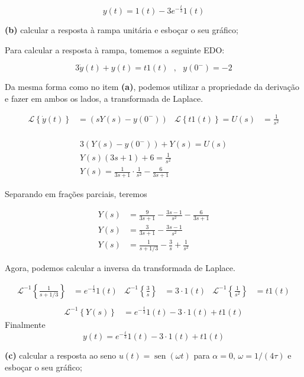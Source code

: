 \documentclass{article}
\DeclareMathOperator{\sen}{sen}
\begin{document}
\[y(t) = 1(t) - 3e^{-\frac{t}{3}}1(t)\]


\textbf{(b)} calcular a resposta à rampa unitária e esboçar o seu gráfico;

Para calcular a resposta à rampa, tomemos a seguinte EDO:

\[3\dot{y}(t) + y(t) = t1(t) \,\,\,\,,\,\,\,\,y(0^-) = -2\]

Da mesma forma como no item \textbf{(a)}, podemos utilizar a propriedade da derivação e fazer em ambos os lados, a transformada de Laplace.

\begin{align*}
    \mathcal{L}\left\{\dot{y}(t)\right\} &= \left(sY(s) - y(0^-)\right) & \mathcal{L}\left\{t1(t)\right\} = U(s) &= \frac{1}{s^2}\\
\end{align*}

\begin{align*}
    3(Y(s) - y(0^-)) + Y(s) = U(s)\\
    Y(s)(3s + 1) + 6 = \frac{1}{s^2}\\
    Y(s) = \frac{1}{3s + 1}\cdot\frac{1}{s^2} - \frac{6}{3s + 1}
\end{align*}

Separando em frações parciais, teremos

\begin{align*}
    Y(s) &= \frac{9}{3s + 1} - \frac{3s - 1}{s^2} - \frac{6}{3s + 1}\\
    Y(s) &= \frac{3}{3s + 1} - \frac{3s - 1}{s^2}\\
    Y(s) &= \frac{1}{s + 1/3} - \frac{3}{s} + \frac{1}{s^2}
\end{align*}

Agora, podemos calcular a inversa da transformada de Laplace.

\begin{align*}
    \mathcal{L}^{-1} \left\{\frac{1}{s + 1/3}\right\} &= e^{-\frac{t}{3}}1(t) & \mathcal{L}^{-1} \left\{\frac{3}{s}\right\} &= 3\cdot1(t) & \mathcal{L}^{-1} \left\{\frac{1}{s^2}\right\} &= t1(t)\\
\end{align*}
\begin{align*}
    \mathcal{L}^{-1} \left\{Y(s)\right\} &= e^{-\frac{t}{3}}1(t) - 3\cdot1(t) + t1(t)
\end{align*}
Finalmente
\[y(t) = e^{-\frac{t}{3}}1(t) - 3\cdot1(t) + t1(t)\]

\textbf{(c)} calcular a resposta ao seno $u(t) = \sen(\omega t)$ para $\alpha = 0,\, \omega = 1/(4\tau)$ e esboçar o seu gráfico;
\end{document}
